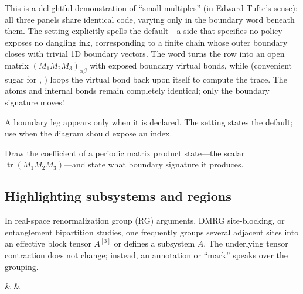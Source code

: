 This is a delightful demonstration of ``small multiples'' (in Edward Tufte's
sense): all three panels share identical code, varying only in the boundary
word beneath them.  The setting  explicitly spells the default---a
side that specifies no policy exposes no dangling ink, corresponding to a
finite chain whose outer boundary closes with trivial 1D boundary vectors.
The word  turns the row into an open matrix
$(M_1M_2M_3)_{\alpha\beta}$ with exposed boundary virtual bonds, while
 (convenient sugar for ,
) loops the virtual bond back upon itself to compute
the trace.  The atoms and internal bonds remain completely identical; only the
boundary signature moves!

\dbendpar A boundary leg appears only when it is declared.  The setting
 states the default; use  when the diagram should
expose an index.

 Draw the coefficient of a periodic matrix product
state---the scalar $\operatorname{tr}(M_1M_2M_3)$---and state what boundary
signature it produces.

\subsection{Highlighting subsystems and regions}

In real-space renormalization group (RG) arguments, DMRG site-blocking, or
entanglement bipartition studies, one frequently groups several adjacent sites
into an effective block tensor $A^{[3]}$ or defines a subsystem $A$.  The
underlying tensor contraction does not change; instead, an annotation or
``mark'' speaks over the grouping.

\begin{tnexample}[
  formula={A^{[3]}=A^{i_1}A^{i_2}A^{i_3}},
  caption={blocking three sites},
  index={The bracket speaks from the south.  Box silhouettes keep the site
    names inside their measured ink.  The signature is Example \ref{tnex:tut-word}'s, unchanged: a
    mark owns no topology.},
  signature={kernel-boundary|signature=open:e, open:w, phys:n, phys:n, phys:n}]
\begin{tenkz}[cols=3]
   &
   &
\end{tenkz}
\end{tnexample}

